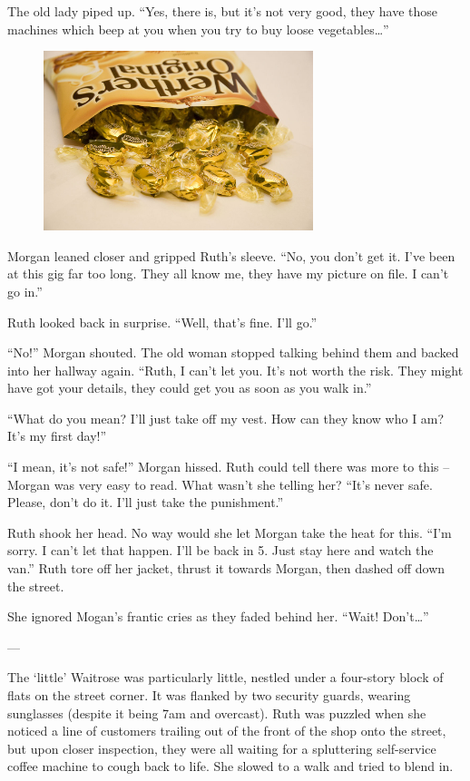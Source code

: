 The old lady piped up. “Yes, there is, but it’s not very good, they have those machines which beep at you when you try to buy loose vegetables…” 

\begin{figure}[h!]
\centering
\includegraphics[width=0.7\textwidth]{./pictures/originals}
\end{figure}

Morgan leaned closer and gripped Ruth’s sleeve. “No, you don’t get it. I’ve been at this gig far too long. They all know me, they have my picture on file. I can’t go in.”

Ruth looked back in surprise. “Well, that’s fine. I’ll go.”

“No!” Morgan shouted. The old woman stopped talking behind them and backed into her hallway again. “Ruth, I can’t let you. It’s not worth the risk. They might have got your details, they could get you as soon as you walk in.”

“What do you mean? I’ll just take off my vest. How can they know who I am? It’s my first day!” 

“I mean, it’s not safe!” Morgan hissed. Ruth could tell there was more to this – Morgan was very easy to read. What wasn’t she telling her? “It’s never safe. Please, don’t do it. I’ll just take the punishment.”

Ruth shook her head. No way would she let Morgan take the heat for this. “I’m sorry. I can’t let that happen. I’ll be back in 5. Just stay here and watch the van.” Ruth tore off her jacket, thrust it towards Morgan, then dashed off down the street. 

She ignored Mogan’s frantic cries as they faded behind her. “Wait! Don’t…”

--- 

The ‘little’ Waitrose was particularly little, nestled under a four-story block of flats on the street corner. It was flanked by two 
security guards, wearing sunglasses (despite it being 7am and overcast). Ruth was puzzled when she noticed a line of customers trailing out of the front of the shop onto the street, but upon closer inspection, they were all waiting for a spluttering self-service coffee machine to cough back to life. She slowed to a walk and tried to blend in. 

